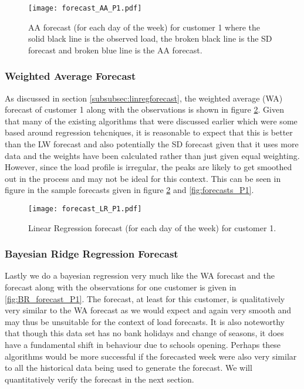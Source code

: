 \documentclass[a4paper]{article}
\begin{document}
\begin{figure}
\centering
\texttt{[image: forecast\_AA\_P1.pdf]}
\caption{AA forecast (for each day of the week) for customer 1 where the solid black line is the observed load, the broken black line is the SD forecast and broken blue line is the AA forecast.}
\label{fig:AA_forecast_P1} 
\end{figure}


\subsubsection{Weighted Average Forecast} \label{subsubsec:lin_reg_res}
As discussed in section \ref{subsubsec:linregforecast}, the weighted average (WA) forecast of customer 1 along with the observations is shown in figure \ref{fig:LR_forecast_P1}. Given that many of the existing algorithms that were discussed earlier which were some based around regression tehcniques, it is reasonable to expect that this is better than the LW forecast and also potentially the SD forecast given that it uses more data and the weights have been calculated rather than just given equal weighting. However, since the load profile is irregular, the peaks are likely to get smoothed out in the process and may not be ideal for this context. This can be seen in figure in the sample forecasts given in figure \ref{fig:LR_forecast_P1} and \ref{fig:forecasts_P1}. 
\begin{figure}
\centering
\texttt{[image: forecast\_LR\_P1.pdf]}
\caption{Linear Regression forecast (for each day of the week) for customer 1.}
\label{fig:LR_forecast_P1} 
\end{figure}

\subsubsection{Bayesian Ridge Regression Forecast} \label{subsubsec:brr_res}
Lastly we do a bayesian regression very much like the WA forecast and the forecast along with the observations for one customer is given in \ref{fig:BR_forecast_P1}. The forecast, at least for this customer, is qualitatively very similar to the WA forecast as we would expect and again very smooth and may thus be unsuitable for the context of load forecasts. It is also noteworthy that though this data set has no bank holidays and change of seasons, it does have a fundamental shift in behaviour due to schools opening. Perhaps these algorithms would be more successful if the forecasted week were also very similar to all the historical data being used to generate the forecast. We will quantitatively verify the forecast in the next section.
\end{document}
